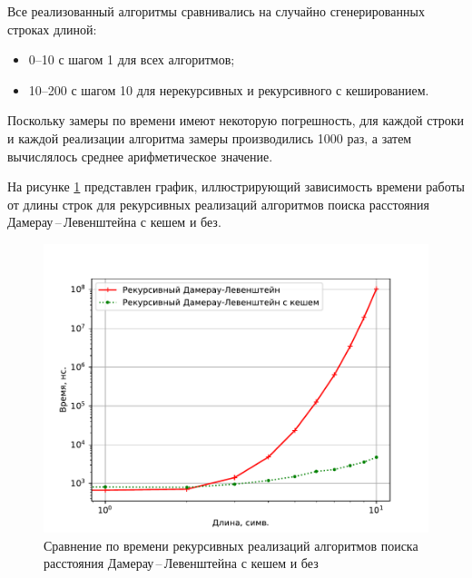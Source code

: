 Все реализованный алгоритмы сравнивались на случайно сгенерированных строках длиной:
\begin{itemize}
	\item 0--10 с шагом 1 для всех алгоритмов;
	\item 10--200 с шагом 10 для нерекурсивных и рекурсивного с кешированием. 
\end{itemize}

Поскольку замеры по времени имеют некоторую погрешность, для каждой строки и каждой реализации алгоритма замеры производились 1000 раз, а затем вычислялось среднее арифметическое значение.

На рисунке \ref{plt:time_01} представлен график, иллюстрирующий зависимость времени работы от длины строк для рекурсивных реализаций алгоритмов поиска расстояния Дамерау\,--\,Левенштейна с кешем и без.
\begin{figure}[h]
	\centering
	\includegraphics[height=0.5\textheight, page=1]{img/figures.pdf}
	\caption{Сравнение по времени рекурсивных реализаций алгоритмов поиска расстояния Дамерау\,--\,Левенштейна с кешем и без}
	\label{plt:time_01}
\end{figure}

